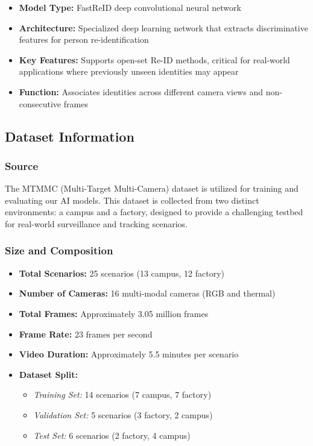 \begin{itemize}
    \item \textbf{Model Type:} FastReID deep convolutional neural network
    \item \textbf{Architecture:} Specialized deep learning network that extracts discriminative features for person re-identification
    \item \textbf{Key Features:} Supports open-set Re-ID methods, critical for real-world applications where previously unseen identities may appear
    \item \textbf{Function:} Associates identities across different camera views and non-consecutive frames
\end{itemize}

\subsection{Dataset Information}
\label{subsection:dataset-information}

\subsubsection{Source}
\label{subsubsection:dataset-source}

The MTMMC (Multi-Target Multi-Camera) dataset is utilized for training and evaluating our AI models. This dataset is collected from two distinct environments: a campus and a factory, designed to provide a challenging testbed for real-world surveillance and tracking scenarios.

\subsubsection{Size and Composition}
\label{subsubsection:dataset-composition}

\begin{itemize}
    \item \textbf{Total Scenarios:} 25 scenarios (13 campus, 12 factory)
    \item \textbf{Number of Cameras:} 16 multi-modal cameras (RGB and thermal)
    \item \textbf{Total Frames:} Approximately 3.05 million frames
    \item \textbf{Frame Rate:} 23 frames per second
    \item \textbf{Video Duration:} Approximately 5.5 minutes per scenario
    \item \textbf{Dataset Split:}
    \begin{itemize}
        \item \textit{Training Set:} 14 scenarios (7 campus, 7 factory)
        \item \textit{Validation Set:} 5 scenarios (3 factory, 2 campus)
        \item \textit{Test Set:} 6 scenarios (2 factory, 4 campus)
    \end{itemize}
\end{itemize}

